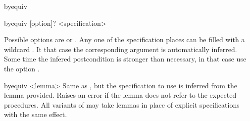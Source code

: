 \begin{tactic}{byequiv}
\begin{tsyntax}{byequiv [option]? <specification>}
\begin{mathpar}
    
  \end{mathpar}
 
 \end{tsyntax}

  Possible options are  or .
  Any one of the specification places can be filled
  with a wildcard \tct{_}. It that case the corresponding argument 
  is automatically inferred. Some time the infered postcondition  
  is stronger than necessary, in that case use the option .
  
  \begin{tsyntax}{byequiv <lemma>}
  Same as , but the specification to use is 
  inferred from the lemma provided. Raises an error if the lemma does 
  not refer to the expected procedures. All variants of  
  may take lemmas in place of explicit specifications with the same effect.
  \end{tsyntax}


\end{tactic}
